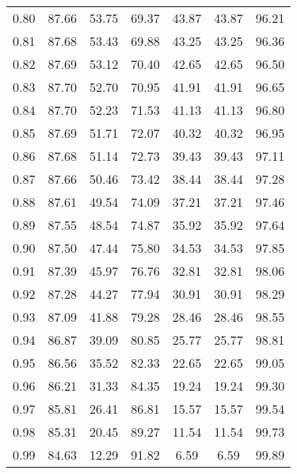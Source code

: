 \begin{tabular}{|c|c|c|c|c|c|c|}
      0.80 &     87.66 &     53.75 &      69.37 &   43.87 &      43.87 &         96.21 \\
      0.81 &     87.68 &     53.43 &      69.88 &   43.25 &      43.25 &         96.36 \\
      0.82 &     87.69 &     53.12 &      70.40 &   42.65 &      42.65 &         96.50 \\
      0.83 &     87.70 &     52.70 &      70.95 &   41.91 &      41.91 &         96.65 \\
      0.84 &     87.70 &     52.23 &      71.53 &   41.13 &      41.13 &         96.80 \\
      0.85 &     87.69 &     51.71 &      72.07 &   40.32 &      40.32 &         96.95 \\
      0.86 &     87.68 &     51.14 &      72.73 &   39.43 &      39.43 &         97.11 \\
      0.87 &     87.66 &     50.46 &      73.42 &   38.44 &      38.44 &         97.28 \\
      0.88 &     87.61 &     49.54 &      74.09 &   37.21 &      37.21 &         97.46 \\
      0.89 &     87.55 &     48.54 &      74.87 &   35.92 &      35.92 &         97.64 \\
      0.90 &     87.50 &     47.44 &      75.80 &   34.53 &      34.53 &         97.85 \\
      0.91 &     87.39 &     45.97 &      76.76 &   32.81 &      32.81 &         98.06 \\
      0.92 &     87.28 &     44.27 &      77.94 &   30.91 &      30.91 &         98.29 \\
      0.93 &     87.09 &     41.88 &      79.28 &   28.46 &      28.46 &         98.55 \\
      0.94 &     86.87 &     39.09 &      80.85 &   25.77 &      25.77 &         98.81 \\
      0.95 &     86.56 &     35.52 &      82.33 &   22.65 &      22.65 &         99.05 \\
      0.96 &     86.21 &     31.33 &      84.35 &   19.24 &      19.24 &         99.30 \\
      0.97 &     85.81 &     26.41 &      86.81 &   15.57 &      15.57 &         99.54 \\
      0.98 &     85.31 &     20.45 &      89.27 &   11.54 &      11.54 &         99.73 \\
      0.99 &     84.63 &     12.29 &      91.82 &    6.59 &       6.59 &         99.89 \\
\bottomrule
\end{tabular}
